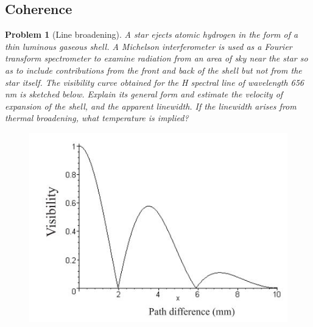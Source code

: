 \documentclass[a4paper]{article}
\theoremstyle{new}
\newtheorem{qns}{Problem}
\begin{document}
\subsection*{Coherence}
\begin{qns}[Line broadening]
A star ejects atomic hydrogen in the form of a thin luminous gaseous shell. A Michelson interferometer is used as a Fourier transform spectrometer to examine radiation from an area of sky near the star so as to include contributions from the front and back of the shell but not from the star itself. The visibility curve obtained for the H spectral line of wavelength 656 nm is sketched below. Explain its general form and estimate the velocity of expansion of the shell, and the apparent linewidth. If the linewidth arises from thermal broadening, what temperature is implied?
\begin{figure}[H]
    \centering
    \includegraphics[scale=0.6]{EOQ14.JPG}
\end{figure}
\end{qns}
\end{document}
